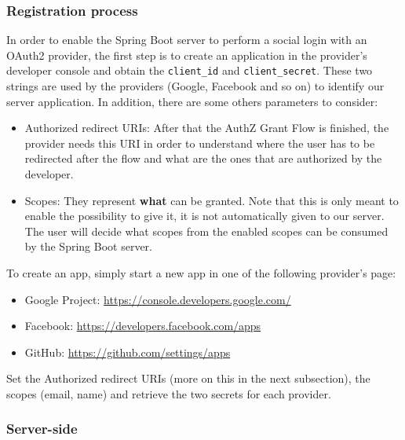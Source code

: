 \subsubsection{Registration process}
In order to enable the Spring Boot server to perform a social login with an OAuth2 provider, the first step is to create an application in the provider's developer console and obtain the \texttt{client\_id} and \texttt{client\_secret}. These two strings are used by the providers (Google, Facebook and so on) to identify our server application. In addition, there are some others parameters to consider:

\begin{itemize}
    \item Authorized redirect URIs: After that the AuthZ Grant Flow is finished, the provider needs this URI in order to understand where the user has to be redirected after the flow and what are the ones that are authorized by the developer.
    \item Scopes: They represent \textbf{what} can be granted. Note that this is only meant to enable the possibility to give it, it is not automatically given to our server. The user will decide what scopes from the enabled scopes can be consumed by the Spring Boot server.
\end{itemize}

\noindent To create an app, simply start a new app in one of the following provider's page:

\begin{itemize}
    \item Google Project: \href{https://console.developers.google.com/}{https://console.developers.google.com/}
    \item Facebook: \href{https://developers.facebook.com/apps}{https://developers.facebook.com/apps}
    \item GitHub: \href{https://github.com/settings/apps}{https://github.com/settings/apps}
\end{itemize}

\noindent Set the Authorized redirect URIs (more on this in the next subsection), the scopes (email, name) and retrieve the two secrets for each provider.

\subsubsection{Server-side}


